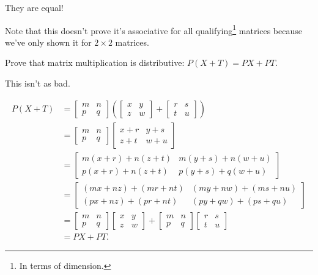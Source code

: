 \documentclass[../gatm_answers.tex]{subfiles}
\begin{document}
They are equal!

Note that this doesn't prove it's associative for all qualifying\footnote{In terms of dimension.} matrices because we've only shown it for $2\times 2$ matrices.

\begin{outer_problem}
\item Prove that matrix multiplication is distributive: $P(X+T)=PX+PT$.
\end{outer_problem}

This isn't as bad.

\begin{align*}
P(X+T) &= \begin{bmatrix} m & n \\ p & q \end{bmatrix}\left(\begin{bmatrix} x & y \\ z & w \end{bmatrix} + \begin{bmatrix} r & s \\ t & u \end{bmatrix}\right) \\
&= \begin{bmatrix} m & n \\ p & q \end{bmatrix}\begin{bmatrix} x + r & y + s \\ z + t & w + u\end{bmatrix} \\
&= \begin{bmatrix}m(x+r) + n(z+t) & m(y+s) + n(w+u) \\ p(x+r) + n(z+t) & p(y+s) + q(w+u) \end{bmatrix} \\
&= \begin{bmatrix}(mx+nz) + (mr+nt) & (my+nw) + (ms+nu) \\ (px+nz) + (pr+nt) & (py+qw) + (ps+qu)\end{bmatrix} \\
&= \begin{bmatrix}m & n \\ p & q \end{bmatrix} \begin{bmatrix}x & y \\ z & w \end{bmatrix} + \begin{bmatrix}m & n \\ p & q \end{bmatrix} \begin{bmatrix} r & s \\ t & u \end{bmatrix} \\
&= PX + PT.
\end{align*}
\end{document}
